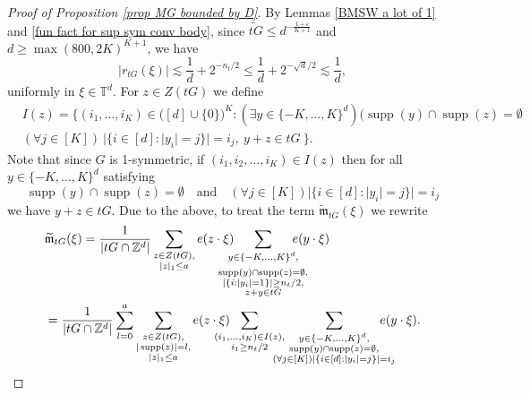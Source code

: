 \documentclass[a4paper,oneside, reqno]{amsart}
\numberwithin{equation}{section}
\theoremstyle{definition}%
\theoremstyle{definition}
\theoremstyle{definition}%
\theoremstyle{definition}
\newcommand{\Z}{\mathbb{Z}}
\newcommand{\T}{\mathbb{T}}
\DeclareMathOperator{\supp}{supp}
\begin{document}
\begin{proof}[Proof of Proposition \ref{prop MG bounded by D}]
By Lemmas \ref{BMSW a lot of 1} and \ref{fun fact for sup sym conv body}, since $\widetilde{tG} \le d^{-\frac{1+\varepsilon}{K+1}}$ and $d \geq \max(800,2K)^{K+1}$, we have
\begin{equation}
\label{eq:rsnbound}
|r_{tG}(\xi)| \lesssim \frac{1}{d} + 2^{-n_t/2} \le \frac{1}{d}+2^{-\sqrt{d}/2} \lesssim \frac{1}{d} ,
\end{equation}
uniformly in $\xi \in \T^d$. 
For $z \in Z(tG)$ we define
\begin{align*}
&I(z)=\Big\{ (i_1, \ldots, i_K) \in \big([d]\cup\{0\}\big)^K: (\exists y \in \{-K,\ldots, K \}^d) \big( \supp(y) \cap \supp(z)= \emptyset \\
& (\forall j \in [K]) \ |\{i \in [d]: |y_i|=j \}|=i_j, \ y+z \in tG \ 
\Big\}.
\end{align*}
Note that since $G$ is 1-symmetric, if $(i_1,i_2,...,i_K) \in I(z)$ then for all $y \in \{-K,\ldots, K \}^d$ satisfying
\[
 \supp(y) \cap \supp(z)= \emptyset \quad  \text{and} \quad  (\forall j \in [K]) |\{i \in [d]: |y_i|=j \}|=i_j
\]
we have $y+z \in tG$.
Due to the above, to treat the term $\widetilde{\mathfrak{m}}_{tG}(\xi)$ we rewrite
\begin{align*}
&\widetilde{\mathfrak{m}}_{tG}(\xi)= \frac{1}{|tG \cap \Z^d|} \sum_{\substack{z \in Z(tG), \\ |z|_1 \leq a}} e(z \cdot \xi) \hspace{-0.5cm}\sum_{\substack{y \in \{-K,...,K\}^d, \\ 
\\ \supp(y) \cap \supp(z)= \emptyset, 
\\ |\{i: |y_i|=1 \}| \geq n_t/2,
\\ z+y \in tG
}} \hspace{-0.5cm}e(y \cdot \xi)
\\
&=\frac{1}{|tG \cap \Z^d|} \sum_{l=0}^a \sum_{\substack{z \in Z(tG),
\\ |\supp(z)|=l, \\ |z|_1 \le a
}} e(z \cdot \xi) \hspace{-0.5cm} \sum_{\substack{(i_1,...,i_K) \in I(z), \\
i_1 \geq n_t/2
}} 
\hspace{-0.4cm} \sum_{\substack{y \in \{-K,...,K\}^d, 
\\ \supp(y) \cap \supp(z)= \emptyset, 
\\
(\forall j \in [K]) |\{i \in [d]: |y_i|=j\}|=i_j
}} \hspace{-0.5cm} e(y \cdot \xi).
\end{align*}

\end{proof}
\end{document}
